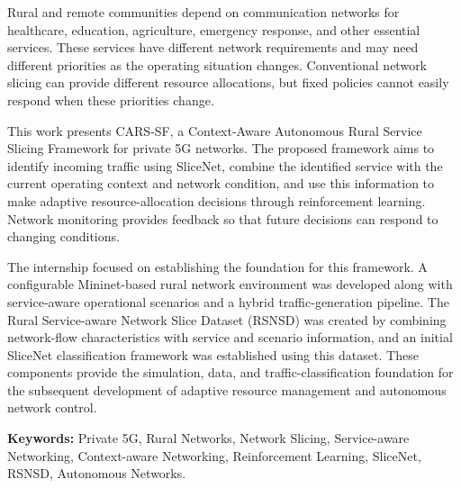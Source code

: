 \documentclass[12pt,a4paper]{report}
\begin{document}
Rural and remote communities depend on communication networks for
healthcare, education, agriculture, emergency response, and other
essential services. These services have different network requirements
and may need different priorities as the operating situation changes.
Conventional network slicing can provide different resource allocations,
but fixed policies cannot easily respond when these priorities change.

This work presents CARS-SF, a Context-Aware Autonomous Rural Service
Slicing Framework for private 5G networks. The proposed framework aims to
identify incoming traffic using SliceNet, combine the identified service
with the current operating context and network condition, and use this
information to make adaptive resource-allocation decisions through
reinforcement learning. Network monitoring provides feedback so that
future decisions can respond to changing conditions.

The internship focused on establishing the foundation for this
framework. A configurable Mininet-based rural network environment was
developed along with service-aware operational scenarios and a hybrid
traffic-generation pipeline. The Rural Service-aware Network Slice
Dataset (RSNSD) was created by combining network-flow characteristics
with service and scenario information, and an initial SliceNet
classification framework was established using this dataset. These
components provide the simulation, data, and traffic-classification
foundation for the subsequent development of adaptive resource
management and autonomous network control.

\vspace{0.4cm}

\noindent\textbf{Keywords:}
Private 5G, Rural Networks, Network Slicing, Service-aware Networking,
Context-aware Networking, Reinforcement Learning, SliceNet, RSNSD,
Autonomous Networks.
	
	
	
	\clearpage
	
	\tableofcontents
	
	\clearpage
	
	\listoffigures
	
	\clearpage
	
	\listoftables
	
	\clearpage
	
	\setcounter{page}{1}
	
\end{document}
